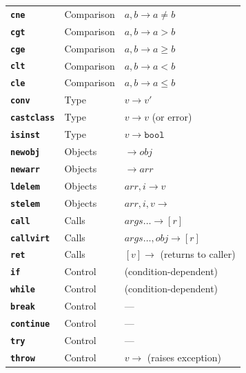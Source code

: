 \documentclass[11pt,a4paper]{article}
\newcommand{\opcode}[1]{\textbf{\texttt{#1}}}
\begin{document}
\begin{longtable}{lll}
  \opcode{cne}       & Comparison & $a, b \to a{\neq}b$ \\
  \opcode{cgt}       & Comparison & $a, b \to a{>}b$ \\
  \opcode{cge}       & Comparison & $a, b \to a{\geq}b$ \\
  \opcode{clt}       & Comparison & $a, b \to a{<}b$ \\
  \opcode{cle}       & Comparison & $a, b \to a{\leq}b$ \\
  \opcode{conv}      & Type       & $v \to v'$ \\
  \opcode{castclass} & Type       & $v \to v$ (or error) \\
  \opcode{isinst}    & Type       & $v \to \texttt{bool}$ \\
  \opcode{newobj}    & Objects    & $\to \mathit{obj}$ \\
  \opcode{newarr}    & Objects    & $\to \mathit{arr}$ \\
  \opcode{ldelem}    & Objects    & $\mathit{arr}, i \to v$ \\
  \opcode{stelem}    & Objects    & $\mathit{arr}, i, v \to$ \\
  \opcode{call}      & Calls      & $\mathit{args}\ldots \to [r]$ \\
  \opcode{callvirt}  & Calls      & $\mathit{args}\ldots, \mathit{obj} \to [r]$ \\
  \opcode{ret}       & Calls      & $[v] \to$ (returns to caller) \\
  \opcode{if}        & Control    & (condition-dependent) \\
  \opcode{while}     & Control    & (condition-dependent) \\
  \opcode{break}     & Control    & --- \\
  \opcode{continue}  & Control    & --- \\
  \opcode{try}       & Control    & --- \\
  \opcode{throw}     & Control    & $v \to$ (raises exception) \\
  \bottomrule
\end{longtable}
\end{document}
